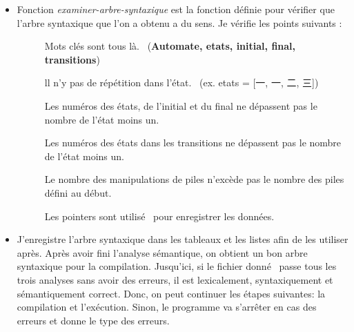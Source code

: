 \documentclass[a4paper,14pt,UTF8]{article}
\begin{document}
	
	\begin{itemize}
		
		\item 
		Fonction \textit{examiner-arbre-syntaxique} est la fonction définie pour vérifier que l'arbre syntaxique que l'on a obtenu a du sens. Je vérifie les points suivants : \par
		
			\begin{description}
				
				\item[] Mots clés sont tous là. \ (\textbf{Automate, etats, initial, final, transitions})\par
				
				\item[] ll n'y pas de répétition dans l'état. \ (ex. etats = [一, 一, 二, 三])\par
				
				\item[] Les numéros des états, de l'initial et du final ne dépassent pas le nombre de l'état moins un.\par
				
				\item[] Les numéros des états dans les transitions ne dépassent pas le nombre de l'état moins un.\par
				
				\item[] Le nombre des manipulations de piles n'excède pas le nombre des piles défini au début.
				
				\item[] Les pointers sont utilisé \ pour enregistrer les données.
			
			\end{description}
		\vspace{3pt}
		
		\item 
		J'enregistre l'arbre syntaxique dans les tableaux et les listes afin de les utiliser après. Après avoir fini l'analyse sémantique, on obtient un bon arbre syntaxique pour la compilation. Jusqu'ici, si le fichier donné \ passe tous les trois analyses sans avoir des erreurs, il est lexicalement, syntaxiquement et sémantiquement correct. Donc, on peut continuer les étapes suivantes: la compilation et l'exécution. Sinon, le programme va s'arrêter en cas des erreurs et donne le type des erreurs.
		
		\begin{figure}[H]
			\setlength{\abovecaptionskip}{-0.cm}
			

\end{figure}
\end{itemize}
\end{document}
